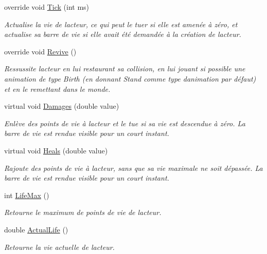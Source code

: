 \begin{DoxyCompactItemize}
override void \hyperlink{class_tentacle_slicers_1_1actors_1_1_living_actor_a1697e3d67782b4df99e48a333a138935}{Tick} (int ms)
\begin{DoxyCompactList}\small\item\em Actualise la vie de l\textquotesingle{}acteur, ce qui peut le tuer si elle est amenée à zéro, et actualise sa barre de vie si elle avait été demandée à la création de l\textquotesingle{}acteur. \end{DoxyCompactList}\item 
override void \hyperlink{class_tentacle_slicers_1_1actors_1_1_living_actor_a7a2b73efca826044f8d15bdc94e13cf7}{Revive} ()
\begin{DoxyCompactList}\small\item\em Ressussite l\textquotesingle{}acteur en lui restaurant sa collision, en lui jouant si possible une animation de type Birth (en donnant Stand comme type d\textquotesingle{}animation par défaut) et en le remettant dans le monde. \end{DoxyCompactList}\item 
virtual void \hyperlink{class_tentacle_slicers_1_1actors_1_1_living_actor_a14c215128afe9c82bb57237501f41640}{Damages} (double value)
\begin{DoxyCompactList}\small\item\em Enlève des points de vie à l\textquotesingle{}acteur et le tue si sa vie est descendue à zéro. La barre de vie est rendue visible pour un court instant. \end{DoxyCompactList}\item 
virtual void \hyperlink{class_tentacle_slicers_1_1actors_1_1_living_actor_ad91b82ee0b4708cb8cb1b305738dde10}{Heals} (double value)
\begin{DoxyCompactList}\small\item\em Rajoute des points de vie à l\textquotesingle{}acteur, sans que sa vie maximale ne soit dépassée. La barre de vie est rendue visible pour un court instant. \end{DoxyCompactList}\item 
int \hyperlink{class_tentacle_slicers_1_1actors_1_1_living_actor_abb76b0632c685efe4592cc8fafa11639}{Life\+Max} ()
\begin{DoxyCompactList}\small\item\em Retourne le maximum de points de vie de l\textquotesingle{}acteur. \end{DoxyCompactList}\item 
double \hyperlink{class_tentacle_slicers_1_1actors_1_1_living_actor_afbfbbe047e1191ec7c71533f7c6a3e62}{Actual\+Life} ()
\begin{DoxyCompactList}\small\item\em Retourne la vie actuelle de l\textquotesingle{}acteur. \end{DoxyCompactList}\end{DoxyCompactItemize}
